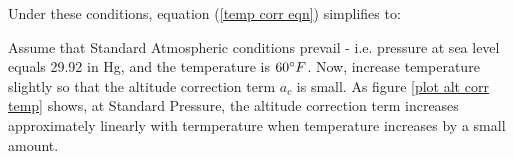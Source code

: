 \documentclass[10pt,a4paper]{article}
\begin{document}
Under these conditions, equation (\ref{temp corr eqn}) simplifies to:



Assume that Standard Atmospheric conditions prevail - i.e. pressure at sea level equals 29.92 in Hg, and the temperature is $60\degree F$. Now, increase temperature slightly so that the altitude correction term $a_c$ is small. As figure \ref{plot alt corr temp} shows, at Standard Pressure, the altitude correction term increases approximately linearly with termperature when temperature increases by a small amount.


\begin{align}
\end{align}
\end{document}
